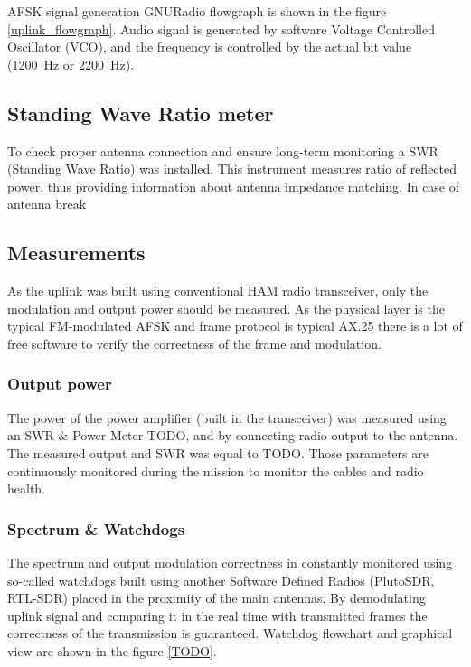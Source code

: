 AFSK signal generation GNURadio flowgraph is shown in the figure \ref{uplink_flowgraph}. Audio signal is generated by software Voltage Controlled Oscillator (VCO), and the frequency is controlled by the actual bit value (\SI{1200}{\hertz} or \SI{2200}{\hertz}).



\subsection{Standing Wave Ratio meter}
To check proper antenna connection and ensure long-term monitoring a SWR (Standing Wave Ratio) was installed. This instrument measures ratio of reflected power, thus providing information about antenna impedance matching. In case of antenna break



\subsection{Measurements}
As the uplink was built using conventional HAM radio transceiver, only the modulation and output power should be measured. As the physical layer is the typical FM-modulated AFSK and frame protocol is typical AX.25 there is a lot of free software to verify the correctness of the frame and modulation.

\subsubsection{Output power}
The power of the power amplifier (built in the transceiver) was measured using an SWR \& Power Meter TODO, and by connecting radio output to the antenna. The measured output and SWR was equal to TODO. Those parameters are continuously monitored during the mission to monitor the cables and radio health.

\subsubsection{Spectrum \& Watchdogs}
The spectrum and output modulation correctness in constantly monitored using so-called watchdogs built using another Software Defined Radios (PlutoSDR, RTL-SDR) placed in the proximity of the main antennas.
By demodulating uplink signal and comparing it in the real time with transmitted frames the correctness of the transmission is guaranteed. Watchdog flowchart and graphical view are shown in the figure \ref{TODO}.



